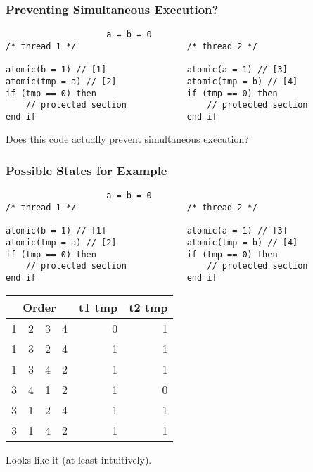 \documentclass[aspectratio=43]{beamer}
\newenvironment{changemargin}[1]{%
  \begin{list}{}{%
    \setlength{\topsep}{0pt}%
    \setlength{\leftmargin}{#1}%
    \setlength{\rightmargin}{1em}
    \setlength{\listparindent}{\parindent}%
    \setlength{\itemindent}{\parindent}%
    \setlength{\parsep}{\parskip}%
  }%
  \item[]}{\end{list}}
\begin{document}
\begin{frame}[fragile]
  \frametitle{Preventing Simultaneous Execution?}

  \begin{lstlisting}
                    a = b = 0
/* thread 1 */                      /* thread 2 */

atomic(b = 1) // [1]                atomic(a = 1) // [3]
atomic(tmp = a) // [2]              atomic(tmp = b) // [4]
if (tmp == 0) then                  if (tmp == 0) then
    // protected section                // protected section
end if                              end if
  \end{lstlisting}

  \begin{changemargin}{1.5cm}
    \item Does this code actually prevent simultaneous execution?
  \end{changemargin}
\end{frame}

\begin{frame}[fragile]
  \frametitle{Possible States for Example}

  \begin{lstlisting}
                    a = b = 0
/* thread 1 */                      /* thread 2 */

atomic(b = 1) // [1]                atomic(a = 1) // [3]
atomic(tmp = a) // [2]              atomic(tmp = b) // [4]
if (tmp == 0) then                  if (tmp == 0) then
    // protected section                // protected section
end if                              end if
  \end{lstlisting}

  \begin{center}
  \begin{tabular}{r r r r | r r}
    \multicolumn{4}{c|}{Order} & t1 tmp & t2 tmp\\
    \hline
    1 & 2 & 3 & 4 & 0 & 1\\
    1 & 3 & 2 & 4 & 1 & 1\\
    1 & 3 & 4 & 2 & 1 & 1\\
    3 & 4 & 1 & 2 & 1 & 0\\
    3 & 1 & 2 & 4 & 1 & 1\\
    3 & 1 & 4 & 2 & 1 & 1\\
  \end{tabular}
  \end{center}

  \begin{changemargin}{1.5cm}
    Looks like it (at least intuitively).
  \end{changemargin}
\end{frame}
\end{document}
